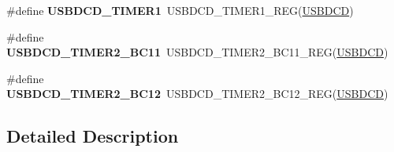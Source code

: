 \begin{DoxyCompactItemize}
\item 
\#define {\bfseries U\+S\+B\+D\+C\+D\+\_\+\+T\+I\+M\+E\+R1}~U\+S\+B\+D\+C\+D\+\_\+\+T\+I\+M\+E\+R1\+\_\+\+R\+EG(\hyperlink{group__USBDCD__Peripheral__Access__Layer_gacd05c07582eca3f464f8c7436ed56ec1}{U\+S\+B\+D\+CD})\hypertarget{group__USBDCD__Register__Accessor__Macros_gacf474d5bde6a1007416398682f014768}{}\label{group__USBDCD__Register__Accessor__Macros_gacf474d5bde6a1007416398682f014768}

\item 
\#define {\bfseries U\+S\+B\+D\+C\+D\+\_\+\+T\+I\+M\+E\+R2\+\_\+\+B\+C11}~U\+S\+B\+D\+C\+D\+\_\+\+T\+I\+M\+E\+R2\+\_\+\+B\+C11\+\_\+\+R\+EG(\hyperlink{group__USBDCD__Peripheral__Access__Layer_gacd05c07582eca3f464f8c7436ed56ec1}{U\+S\+B\+D\+CD})\hypertarget{group__USBDCD__Register__Accessor__Macros_gab5f6e255be874b10b2b5026f3b9f9e03}{}\label{group__USBDCD__Register__Accessor__Macros_gab5f6e255be874b10b2b5026f3b9f9e03}

\item 
\#define {\bfseries U\+S\+B\+D\+C\+D\+\_\+\+T\+I\+M\+E\+R2\+\_\+\+B\+C12}~U\+S\+B\+D\+C\+D\+\_\+\+T\+I\+M\+E\+R2\+\_\+\+B\+C12\+\_\+\+R\+EG(\hyperlink{group__USBDCD__Peripheral__Access__Layer_gacd05c07582eca3f464f8c7436ed56ec1}{U\+S\+B\+D\+CD})\hypertarget{group__USBDCD__Register__Accessor__Macros_ga18aadd71a85c0649a689a33c8ddd16f6}{}\label{group__USBDCD__Register__Accessor__Macros_ga18aadd71a85c0649a689a33c8ddd16f6}

\end{DoxyCompactItemize}


\subsection{Detailed Description}
